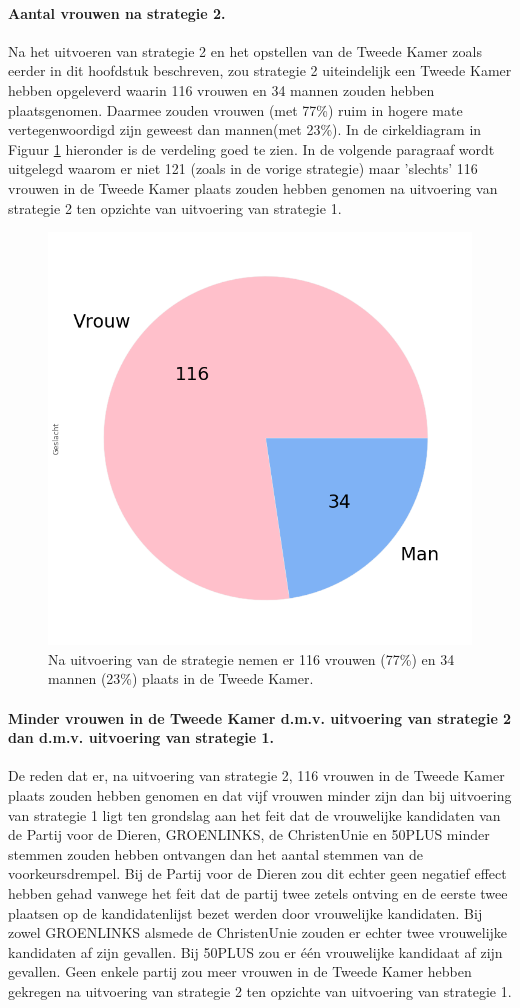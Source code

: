 \paragraph{Aantal vrouwen na strategie 2.}
Na het uitvoeren van strategie 2 en het opstellen van de Tweede Kamer zoals eerder in dit hoofdstuk beschreven, zou strategie 2 uiteindelijk een Tweede Kamer hebben opgeleverd waarin 116 vrouwen en 34 mannen zouden hebben plaatsgenomen. Daarmee zouden vrouwen (met 77\%) ruim in hogere mate vertegenwoordigd zijn geweest dan mannen(met 23\%). In de cirkeldiagram in Figuur \ref{fig:pcS2V} hieronder is de verdeling goed te zien. In de volgende paragraaf wordt uitgelegd waarom er niet 121 (zoals in de vorige strategie) maar 'slechts' 116 vrouwen in de Tweede Kamer plaats zouden hebben genomen na uitvoering van strategie 2 ten opzichte van uitvoering van strategie 1.

\begin{figure}[H]
\centering
	\includegraphics[width=0.35\linewidth]{pie_chart_willekeurig.png}

			\caption{Na uitvoering van de strategie nemen er 116 vrouwen (77\%) en 34 mannen (23\%) plaats in de Tweede Kamer.}

\label{fig:pcS2V}
\end{figure}

\paragraph{Minder vrouwen in de Tweede Kamer d.m.v. uitvoering van strategie 2 dan d.m.v. uitvoering van strategie 1.}
De reden dat er, na uitvoering van strategie 2, 116 vrouwen in de Tweede Kamer plaats zouden hebben genomen en dat vijf vrouwen minder zijn dan bij uitvoering van strategie 1 ligt ten grondslag aan het feit dat de vrouwelijke kandidaten van de Partij voor de Dieren, GROENLINKS, de ChristenUnie en 50PLUS minder stemmen zouden hebben ontvangen dan het aantal stemmen van de voorkeursdrempel. Bij de Partij voor de Dieren zou dit echter geen negatief effect hebben gehad vanwege het feit dat de partij twee zetels ontving en de eerste twee plaatsen op de kandidatenlijst bezet werden door vrouwelijke kandidaten. Bij zowel GROENLINKS alsmede de ChristenUnie zouden er echter twee vrouwelijke kandidaten af zijn gevallen. Bij 50PLUS zou er één vrouwelijke kandidaat af zijn gevallen. Geen enkele partij zou meer vrouwen in de Tweede Kamer hebben gekregen na uitvoering van strategie 2 ten opzichte van uitvoering van strategie 1.   


